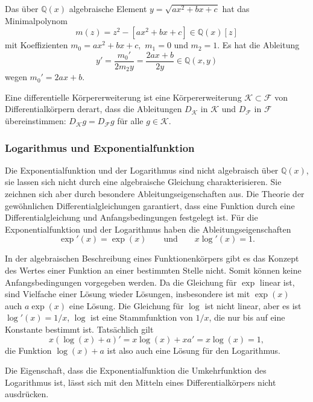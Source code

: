 \begin{beispiel}
Das über $\mathbb{Q}(x)$ algebraische Element $y=\sqrt{ax^2+bx+c}$
hat das Minimalpolynom
\[
m(z)
=
z^2 - [ax^2+bx+c]
\in
\mathbb{Q}(x)[z]
\]
mit Koeffizienten $m_0 = ax^2+bx+c,$ $m_1=0$ und $m_2=1$.
Es hat die Ableitung
\[
y'
= 
\frac{m_0'}{2m_2y}
=
\frac{
2ax+b
}{
2y
}
\in
\mathbb{Q}(x,y)
\]
wegen $m_0'=2ax+b$.
\end{beispiel}

\begin{definition}
Eine differentielle Körpererweiterung ist eine Körpererweiterung
$\mathscr{K}\subset\mathscr{F}$ von Differentialkörpern derart, dass
die Ableitungen $D_{\mathscr{K}}$ in $\mathscr{K}$
und $D_{\mathscr{F}}$ in $\mathscr{F}$ übereinstimmen:
\(
D_{\mathscr{K}}g= D_{\mathscr{F}} g
\)
für alle $g\in\mathscr{K}$.
\end{definition}

%
%
\subsubsection{Logarithmus und Exponentialfunktion}
Die Exponentialfunktion und der Logarithmus sind nicht algebraisch
über $\mathbb{Q}(x)$, sie lassen sich nicht durch eine algebraische
Gleichung charakterisieren.
Sie zeichnen sich aber durch besondere Ableitungseigenschaften aus.
Die Theorie der gewöhnlichen Differentialgleichungen garantiert,
dass eine Funktion durch eine Differentialgleichung und Anfangsbedingungen
festgelegt ist.
\label{buch:integral:expundlog}
Für die Exponentialfunktion und der Logarithmus haben die 
Ableitungseigenschaften
\[
\exp'(x) = \exp(x)
\qquad\text{und}\qquad
x \log'(x) = 1.
\]
%
%

In der algebraischen Beschreibung eines Funktionenkörpers gibt es
das Konzept des Wertes einer Funktion an einer bestimmten Stelle nicht.
Somit können keine Anfangsbedingungen vorgegeben werden.
Da die Gleichung für $\exp$ linear ist, sind Vielfache einer Lösung wieder
Lösungen,
insbesondere ist mit $\exp(x)$ auch $a\exp(x)$ eine Lösung.
Die Gleichung für $\log$ ist nicht linear, aber es ist
$\log'(x) = 1/x$, $\log$ ist eine Stammfunktion von $1/x$, die
nur bis auf eine Konstante bestimmt ist.
Tatsächlich gilt
\[
x(\log(x)+a)'
=
x\log(x) + xa' = x\log(x)=1,
\]
die Funktion $\log(x)+a$ ist also auch eine Lösung für den Logarithmus.

Die Eigenschaft, dass die Exponentialfunktion die Umkehrfunktion
des Logarithmus ist, lässt sich mit den Mitteln eines Differentialkörpers
nicht ausdrücken.

